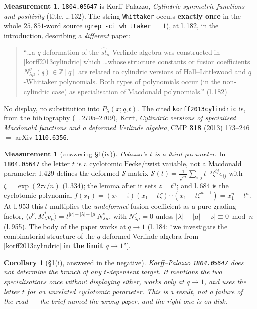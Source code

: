 \documentclass[11pt]{article}
\theoremstyle{plain}
\newtheorem{corollary}[theorem]{Corollary}
\theoremstyle{definition}
\newtheorem{measurement}[theorem]{Measurement}
\begin{document}
\begin{measurement}\label{m:palazzo}
\texttt{1804.05647} is Korff--Palazzo, \emph{Cylindric symmetric functions and positivity}
(title, l.\,132). The string \texttt{Whittaker} occurs \textbf{exactly once} in the whole
$25{,}851$-word source (\texttt{grep -ci whittaker} $=1$), at l.\,182, in the
introduction, describing a \emph{different} paper:
\begin{quote}\small
``\dots a $q$-deformation of the $\widehat{sl}_n$-Verlinde algebra was constructed in
[korff2013cylindric] which \dots whose structure constants or fusion coefficients
$N^\nu_{\lambda\mu}(q)\in\mathbb{Z}[q]$ are related to cylindric versions of
Hall--Littlewood and $q$-Whittaker polynomials. Both types of polynomials occur (in the
non-cylindric case) as specialisation of Macdonald polynomials.'' (l.\,182)
\end{quote}
No display, no substitution into $P_\lambda(x;q,t)$. The cited
\texttt{korff2013cylindric} is, from the bibliography (ll.\,2705--2709), Korff,
\emph{Cylindric versions of specialised Macdonald functions and a deformed Verlinde
algebra}, CMP \textbf{318} (2013) 173--246 $=$ arXiv \texttt{1110.6356}.
\end{measurement}

\begin{measurement}[answering \S1(iv)]\label{m:thirdparam}
\emph{Palazzo's $t$ is a third parameter.} In \texttt{1804.05647} the letter $t$ is a
cyclotomic Hecke/twist variable, not a Macdonald parameter: l.\,429 defines the deformed
$\mathcal{S}$-matrix $\mathcal{S}(t)=\frac{1}{\sqrt n}\sum_{i,j}t^{-j}\zeta^{ij}e_{ij}$ with
$\zeta=\exp(2\pi\iota/n)$ (l.\,334); the lemma after it sets $z=t^n$; and l.\,684 is the
cyclotomic polynomial $f(x_1)=(x_1-t)(x_1-t\zeta)\cdots(x_1-t\zeta^{n-1})=x_1^n-t^n$. At
l.\,953 this $t$ multiplies the \emph{undeformed} fusion coefficient as a pure grading
factor, $\langle v^\nu, M^*_\lambda v_\mu\rangle = t^{|\nu|-|\lambda|-|\mu|}N^\nu_{\lambda\mu}$,
with $N^\nu_{\lambda\mu}=0$ unless $|\lambda|+|\mu|-|\nu|\equiv 0 \bmod n$ (l.\,955). The
body of the paper works at $q\to 1$ (l.\,184: ``we investigate the combinatorial structure
of the $q$-deformed Verlinde algebra from [korff2013cylindric] \textbf{in the limit
$q\to 1$}'').
\end{measurement}

\begin{corollary}[\S1(i), answered in the negative]
Korff--Palazzo \texttt{1804.05647} does not determine the branch of any $t$-dependent target.
It mentions the two specialisations once without displaying either, works only at $q\to 1$,
and uses the letter $t$ for an unrelated cyclotomic parameter. \emph{This is a result, not a
failure of the read} --- the brief named the wrong paper, and the right one is on disk.
\end{corollary}
\end{document}
